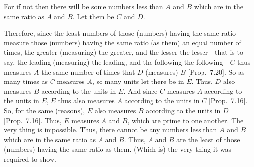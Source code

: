 \begin{Parallel}{}{}
{For if not then there will be some numbers less than $A$ and $B$ which are in
the same ratio as $A$ and $B$. Let them be $C$ and $D$.

\epsfysize=1.8in
\centerline{}

Therefore, since the least numbers of those (numbers) having the
same ratio measure those (numbers) having the same ratio (as them)
an equal number of times, the greater (measuring) the greater, and
the lesser  the lesser---that is to say, the leading (measuring) the leading, and
the following the following---$C$ thus measures $A$ the same number of
times that $D$ (measures) $B$  [Prop.~7.20].
So as many times as $C$ measures $A$, so many units let there be in $E$.
Thus, $D$ also measures $B$ according to the units in $E$. And since $C$ measures
$A$ according to the units in $E$, $E$ thus also measures $A$ according to the
units in $C$ [Prop.~7.16]. So, for the
same (reasons), $E$ also measures $B$ according to the units in $D$  [Prop.~7.16]. Thus, $E$ measures $A$ and $B$, which
are prime to one another. The very thing is impossible. Thus, there cannot
be any numbers less than $A$ and $B$ which are in the same ratio as $A$ and
$B$. Thus, $A$ and $B$ are the least of those (numbers) having the same ratio
as them. (Which is) the very thing it was required to show.}
\end{Parallel}

